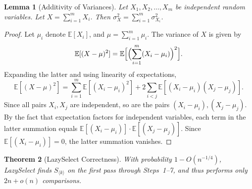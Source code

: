 \documentclass[twoside,12pt]{book}
\theoremstyle{plain}
\newtheorem{theorem}{Theorem}[chapter]
\newtheorem{lemma}[theorem]{Lemma}
\theoremstyle{definition}
\theoremstyle{remark}
\begin{document}
\begin{lemma}[Additivity of Variances]
\label{lemma:var-sum}
Let $X_1, X_2, \ldots, X_m$ be independent random variables. Let $X = \sum_{i=1}^{m} X_i$. Then $\sigma_X^2 = \sum_{i=1}^{m} \sigma_{X_i}^2$.
\end{lemma}

\begin{proof}
Let $\mu_i$ denote $\mathbb{E}[X_i]$, and $\mu = \sum_{i=1}^{m} \mu_i$. The variance of $X$ is given by
\[
\mathbb{E}[(X - \mu)^2] = \mathbb{E}\Bigl[\Bigl(\sum_{i=1}^{m} (X_i - \mu_i)\Bigr)^2\Bigr].
\]
Expanding the latter and using linearity of expectations,
\[
\mathbb{E}[(X - \mu)^2] = \sum_{i=1}^{m} \mathbb{E}[(X_i - \mu_i)^2] + 2 \sum_{i < j} \mathbb{E}[(X_i - \mu_i)(X_j - \mu_j)].
\]
Since all pairs $X_i, X_j$ are independent, so are the pairs $(X_i - \mu_i), (X_j - \mu_j)$. By the fact that expectation factors for independent variables, each term in the latter summation equals $\mathbb{E}[(X_i - \mu_i)] \cdot \mathbb{E}[(X_j - \mu_j)]$. Since $\mathbb{E}[(X_i - \mu_i)] = 0$, the latter summation vanishes.
\end{proof}

\begin{theorem}[LazySelect Correctness]
\label{thm:lazy-select}
With probability $1 - O(n^{-1/4})$, LazySelect finds $S_{\langle k \rangle}$ on the first pass through Steps~1--7, and thus performs only $2n + o(n)$ comparisons.
\end{theorem}
\end{document}
